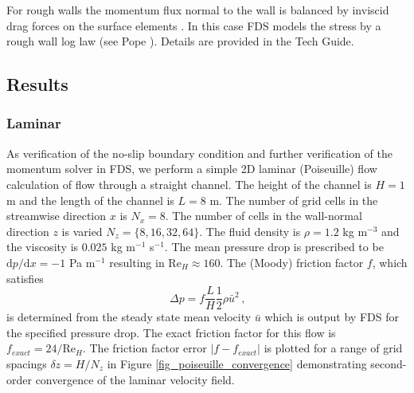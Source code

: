 \documentclass[11pt]{book}
\begin{document}
For rough walls the momentum flux normal to the wall is balanced by inviscid drag forces on the surface elements \cite{TennekesLumley}.  In this case FDS models the stress by a rough wall log law (see Pope \cite{Pope:2000}).  Details are provided in the Tech Guide.

\subsection{Results}
\label{results}

\subsubsection{Laminar}
\label{laminar}

As verification of the no-slip boundary condition and further verification of the momentum solver in FDS, we perform a simple 2D laminar (Poiseuille) flow calculation of
flow through a straight channel.
The height of the channel is $H=1$ m and the length of the channel is $L=8$ m.
The number of grid cells in the streamwise direction $x$ is $N_x = 8$.  The number of cells in the wall-normal direction $z$ is varied $N_z = \{8,16,32,64\}$.
The fluid density is $\rho = 1.2$ kg m$^{-3}$ and the viscosity is $0.025$ kg m$^{-1}$ s$^{-1}$.
The mean pressure drop is prescribed to be $\mbox{d}p/\mbox{d}x = -1$ Pa m$^{-1}$ resulting in Re$_H \approx 160$.  The (Moody) friction factor $f$, which satisfies
\begin{equation}
\label{eqn_moodyf}
\Delta p = f \frac{L}{H} \frac{1}{2} \rho \bar{u}^2 \,\mbox{,}
\end{equation}
is determined from the steady state mean velocity $\bar{u}$ which is output by FDS for the specified pressure drop.  The exact friction factor for this flow is $f_{exact} = 24/\mbox{Re}_H$.  The friction factor error $|f-f_{exact}|$ is plotted for a range of grid spacings $\delta z = H/N_z$ in Figure \ref{fig_poiseuille_convergence} demonstrating second-order convergence of the laminar velocity field.
\end{document}
